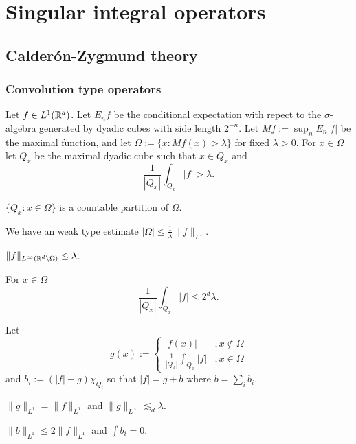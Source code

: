 \documentclass{../../large}
\begin{document}
\part{Singular integral operators}
\chapter{Calder\'on-Zygmund theory}


\section{Convolution type operators}

\begin{prb}
\end{prb}

\begin{prb}
Let $f\in L^1(\mathbb{R}^d)$.
Let $E_nf$ be the conditional expectation with repect to the $\sigma$-algebra generated by dyadic cubes with side length $2^{-n}$.
Let $Mf:=\sup_nE_n|f|$ be the maximal function, and let $\Omega:=\{x:Mf(x)>\lambda\}$ for fixed $\lambda>0$.
For $x\in\Omega$ let $Q_x$ be the maximal dyadic cube such that $x\in Q_x$ and
\[\frac1{|Q_x|}\int_{Q_x}|f|>\lambda.\]
\begin{parts}
\item
$\{Q_x:x\in\Omega\}$ is a countable partition of $\Omega$.
\item
We have an weak type estimate $|\Omega|\le\frac1\lambda\|f\|_{L^1}$.
\item
$\|f\|_{L^\infty(\mathbb{R}^d\setminus\Omega)}\le\lambda$.
\item
For $x\in\Omega$
\[\frac1{|Q_x|}\int_{Q_x}|f|\le2^d\lambda.\]
\end{parts}
\end{prb}

\begin{prb}
Let
\[g(x):=\begin{cases}|f(x)|&,x\notin\Omega\\\frac1{|Q_x|}\int_{Q_x}|f|&,x\in\Omega\end{cases}\]
and $b_i:=(|f|-g)\chi_{Q_i}$ so that $|f|=g+b$ where $b=\sum_ib_i$.
\begin{parts}
\item $\|g\|_{L^1}=\|f\|_{L^1}$ and $\|g\|_{L^\infty}\lesssim_d\lambda$.
\item $\|b\|_{L^1}\le2\|f\|_{L^1}$ and $\int b_i=0$.
\end{parts}
\end{prb}
\begin{pf}

\end{pf}
\end{document}
